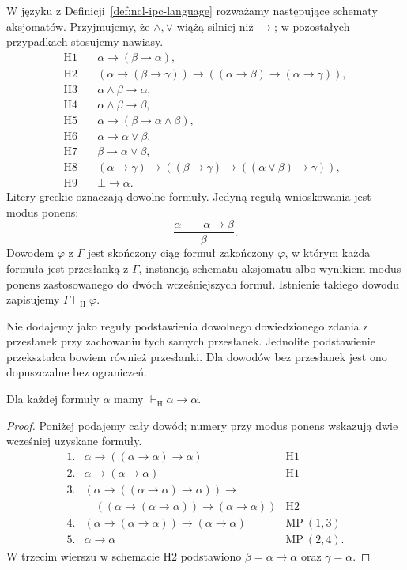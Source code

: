 \begin{definicja}
\label{def:ncl-ipc-hilbert}
W języku z Definicji~\ref{def:ncl-ipc-language}
rozważamy następujące schematy aksjomatów.
Przyjmujemy, że $\wedge,\vee$ wiążą silniej niż $\to$;
w pozostałych przypadkach stosujemy nawiasy.
\begin{align*}
 \mathrm{H1}\quad &\alpha\to(\beta\to\alpha),\\
 \mathrm{H2}\quad &(\alpha\to(\beta\to\gamma))
          \to((\alpha\to\beta)\to(\alpha\to\gamma)),\\
 \mathrm{H3}\quad &\alpha\wedge\beta\to\alpha,\\
 \mathrm{H4}\quad &\alpha\wedge\beta\to\beta,\\
 \mathrm{H5}\quad &\alpha\to(\beta\to\alpha\wedge\beta),\\
 \mathrm{H6}\quad &\alpha\to\alpha\vee\beta,\\
 \mathrm{H7}\quad &\beta\to\alpha\vee\beta,\\
 \mathrm{H8}\quad &(\alpha\to\gamma)\to
       ((\beta\to\gamma)\to((\alpha\vee\beta)\to\gamma)),\\
 \mathrm{H9}\quad &\bot\to\alpha.
\end{align*}
Litery greckie oznaczają dowolne formuły. Jedyną
regułą wnioskowania jest modus ponens:
\[
 \frac{\alpha\qquad \alpha\to\beta}{\beta}.
\]
Dowodem $\varphi$ z $\Gamma$ jest skończony ciąg
formuł zakończony $\varphi$, w którym każda formuła
jest przesłanką z $\Gamma$, instancją schematu
aksjomatu albo wynikiem modus ponens zastosowanego
do dwóch wcześniejszych formuł. Istnienie takiego
dowodu zapisujemy $\Gamma\vdash_{\mathrm H}\varphi$.
\end{definicja}
Nie dodajemy jako reguły podstawienia dowolnego
dowiedzionego zdania z przesłanek przy zachowaniu
tych samych przesłanek. Jednolite podstawienie
przekształca bowiem również przesłanki. Dla dowodów
bez przesłanek jest ono dopuszczalne bez ograniczeń.

\begin{lemat}
\label{lem:ncl-ipc-hilbert-identity}
Dla każdej formuły $\alpha$ mamy
$\vdash_{\mathrm H}\alpha\to\alpha$.
\end{lemat}
\begin{proof}
Poniżej podajemy cały dowód; numery przy modus ponens
wskazują dwie wcześniej uzyskane formuły.
\[
\begin{array}{rll}
1.&\alpha\to((\alpha\to\alpha)\to\alpha)&\mathrm{H1}\\
2.&\alpha\to(\alpha\to\alpha)&\mathrm{H1}\\
3.&(\alpha\to((\alpha\to\alpha)\to\alpha))\to&\\[-2pt]
  &\quad((\alpha\to(\alpha\to\alpha))\to
           (\alpha\to\alpha))&\mathrm{H2}\\
4.&(\alpha\to(\alpha\to\alpha))\to
           (\alpha\to\alpha)&\mathrm{MP}\ (1,3)\\
5.&\alpha\to\alpha&\mathrm{MP}\ (2,4).
\end{array}
\]
W trzecim wierszu w schemacie H2 podstawiono
$\beta=\alpha\to\alpha$ oraz $\gamma=\alpha$.
\end{proof}

